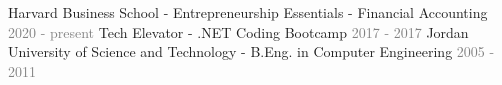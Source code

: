 \begin{cventries}\vspace{-10mm}
\cventry 
    {}
    {}
    {}
    {}
    {}\vspace{-8mm}
\cventry 
    {}
    {\hspace*{0.5mm}\bullet \hspace*{0.5mm} Harvard Business School - \textmd{Entrepreneurship Essentials - Financial Accounting}}
    {\textcolor{graytext}{2020 - present}}
    {}
    {}\vspace{-8mm}  
\cventry 
    {}
    {\hspace*{0.5mm}\bullet \hspace*{0.5mm} Tech Elevator - \textmd{.NET Coding Bootcamp}}
    {\textcolor{graytext}{2017 - 2017}}
    {}
    {}\vspace{-8mm} 
\cventry
    {}
    {\hspace*{0.5mm}\bullet \hspace*{0.5mm} Jordan University of Science and Technology - \textmd{B.Eng. in Computer Engineering}}
    {\textcolor{graytext}{2005 - 2011}}
    {}
    {}
\end{cventries}
